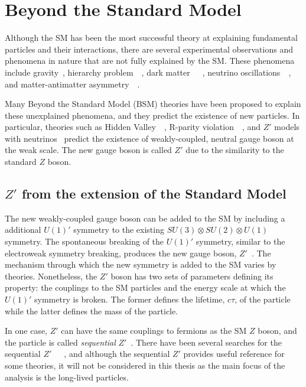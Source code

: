 \section{Beyond the Standard Model}
\label{sec:intro:bsm}

Although the SM has been the most successful theory at explaining fundamental particles and their interactions, there are several experimental observations and phenomena in nature that are not fully explained by the SM. These phenomena include gravity~\cite{PhysRevD.69.105009}, hierarchy problem~\cite{ARKANIHAMED1998263}~\cite{MAGG198061}, dark matter~\cite{navarro1996structure}~\cite{bertone2005particle}~\cite{clowe2006direct}, neutrino oscillations~\cite{ahn2003indications}~\cite{mikheev1985resonance}, and matter-antimatter asymmetry~\cite{toussaint1979matter}~\cite{dine2003origin}. 

Many Beyond the Standard Model (BSM) theories have been proposed to explain these unexplained phenomena, and they predict the existence of new particles. In particular, theories such as Hidden Valley~\cite{strassler2007echoes}~\cite{cassel2010electroweak}, R-parity violation~\cite{senjanovic1975exact}~\cite{mohapatra1981neutrino}, and $Z'$ models with neutrinos~\cite{Basso:2008iv} predict the existence of weakly-coupled, neutral gauge boson at the weak scale. The new gauge boson is called $Z'$ due to the similarity to the standard $Z$ boson. 

\subsection{\texorpdfstring{$Z'$}{Z'} from the extension of the Standard Model}
\label{sec:intro:zprime_extension}

The new weakly-coupled gauge boson can be added to the SM by including a additional $U(1)'$ symmetry to the existing $SU(3) \otimes SU(2) \otimes U(1)$ symmetry. The spontaneous breaking of the $U(1)'$ symmetry, similar to the electroweak symmetry breaking, produces the new gauge boson, $Z'$~\cite{Langacker:2008yv}. The mechanism through which the new symmetry is added to the SM varies by theories. Nonetheless, the $Z'$ boson has two sets of parameters defining its property: the couplings to the SM particles and the energy scale at which the $U(1)'$ symmetry is broken. The former defines the lifetime, $c\tau$, of the particle while the latter defines the mass of the particle.

In one case, $Z'$ can have the same couplings to fermions as the SM $Z$ boson, and the particle is called \textit{sequential} $Z'$~\cite{BARGER1980377}. There have been several searches for the sequential $Z'$~\cite{PhysRevD.86.095010}~\cite{ABAZOV201188}~\cite{PhysRevD.90.052005}, and although the sequential $Z'$ provides useful reference for some theories, it will not be considered in this thesis as the main focus of the analysis is the long-lived particles.

